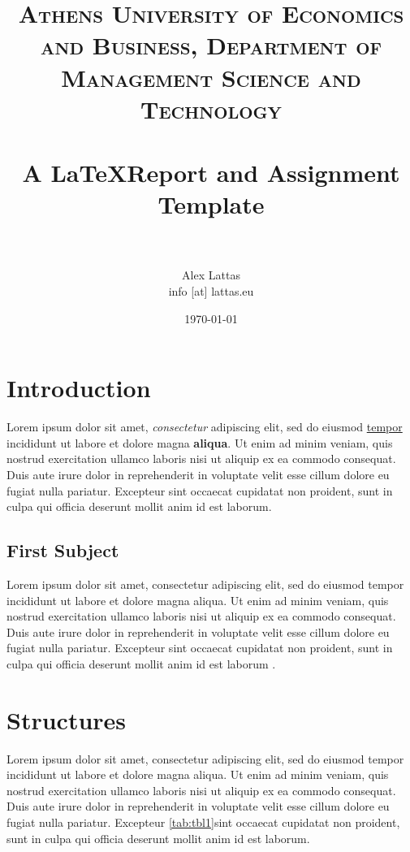 \documentclass[12pt, a4paper]{article} %
\title{	
\normalfont \normalsize 
\textsc{Athens University of Economics and Business, Department of Management Science and Technology} \\ [25pt] %
\horrule{0.5pt} \\[0.4cm] %
\huge A \LaTeX Report and Assignment Template \\ %
\horrule{2pt} \\[0.5cm] %
}
\author{Alex Lattas\\info [at] lattas.eu} %
\date{\normalsize\today} %
\begin{document}
\maketitle %


\section{Introduction}

Lorem ipsum dolor sit amet, \textit{consectetur} %
 adipiscing elit, sed do eiusmod \underline{tempor} %
 incididunt ut labore et dolore magna \textbf{aliqua}. %
Ut enim ad minim veniam, quis nostrud exercitation ullamco laboris nisi ut aliquip ex ea commodo consequat. Duis aute irure dolor in reprehenderit in voluptate velit esse cillum dolore eu fugiat nulla pariatur. Excepteur sint occaecat cupidatat non proident, sunt in culpa qui officia deserunt mollit anim id est laborum.

\subsection{First Subject}
Lorem ipsum dolor sit amet, consectetur adipiscing elit, sed do eiusmod tempor incididunt ut labore et dolore magna aliqua. Ut enim ad minim veniam, quis nostrud exercitation ullamco laboris nisi ut aliquip ex ea commodo consequat. Duis aute irure dolor in reprehenderit in voluptate velit esse cillum dolore eu fugiat nulla pariatur. Excepteur sint occaecat cupidatat non proident, sunt in culpa qui officia deserunt mollit anim id est laborum \cite{dummy}.


\section{Structures}

Lorem ipsum dolor sit amet, consectetur adipiscing elit, sed do eiusmod tempor incididunt ut labore et dolore magna aliqua. Ut enim ad minim veniam, quis nostrud exercitation ullamco laboris nisi ut aliquip ex ea commodo consequat. Duis aute irure dolor in reprehenderit in voluptate velit esse cillum dolore eu fugiat nulla pariatur. Excepteur \ref{tab:tbl1}sint occaecat cupidatat non proident, sunt in culpa qui officia deserunt mollit anim id est laborum.
\end{document}

